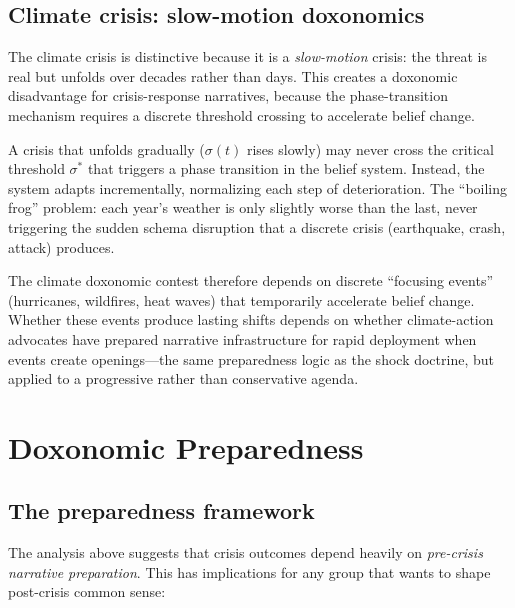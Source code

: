 \subsection{Climate crisis: slow-motion doxonomics}

The climate crisis is distinctive because it is a \emph{slow-motion} crisis: the threat is real but unfolds over decades rather than days.
This creates a doxonomic disadvantage for crisis-response narratives, because the phase-transition mechanism requires a discrete threshold crossing to accelerate belief change.

\begin{proposition}
\label{prop:slow-crisis}
A crisis that unfolds gradually ($\sigma(t)$ rises slowly) may never cross the critical threshold $\sigma^*$ that triggers a phase transition in the belief system.
Instead, the system adapts incrementally, normalizing each step of deterioration.
The ``boiling frog'' problem: each year's weather is only slightly worse than the last, never triggering the sudden schema disruption that a discrete crisis (earthquake, crash, attack) produces.
\end{proposition}

The climate doxonomic contest therefore depends on discrete ``focusing events'' (hurricanes, wildfires, heat waves) that temporarily accelerate belief change.
Whether these events produce lasting shifts depends on whether climate-action advocates have prepared narrative infrastructure for rapid deployment when events create openings---the same preparedness logic as the shock doctrine, but applied to a progressive rather than conservative agenda.

\section{Doxonomic Preparedness}
\label{sec:ch29-preparedness}

\subsection{The preparedness framework}

The analysis above suggests that crisis outcomes depend heavily on \emph{pre-crisis narrative preparation}.
This has implications for any group that wants to shape post-crisis common sense:

